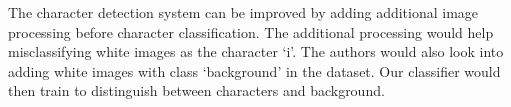 \documentclass[../main.tex]{subfiles}
\begin{document}
The character detection system can be improved by adding additional image
processing before character classification. The additional processing would help
misclassifying white images as the character `i'. The authors would also look
into adding white images with class `background' in the dataset. Our classifier
would then train to distinguish between characters and background.
\end{document}
